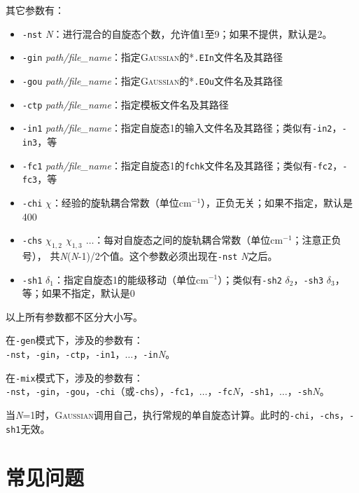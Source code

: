 \documentclass[UTF8]{ctexart}
\begin{document}
\bigskip
其它参数有：
\begin{itemize}[leftmargin= 0 pt]
\item \verb|-nst| \textit{N}：进行混合的自旋态个数，允许值1至9；如果不提供，默认是2。
\item \verb|-gin| \textit{path/file\_name}：指定\textsc{Gaussian}的*\verb|.EIn|文件名及其路径
\item \verb|-gou| \textit{path/file\_name}：指定\textsc{Gaussian}的*\verb|.EOu|文件名及其路径
\item \verb|-ctp| \textit{path/file\_name}：指定模板文件名及其路径
\item \verb|-in1| \textit{path/file\_name}：指定自旋态1的输入文件名及其路径；类似有\verb|-in2|，\verb|-in3|，等
\item \verb|-fc1| \textit{path/file\_name}：指定自旋态1的\verb|fchk|文件名及其路径；类似有\verb|-fc2|，\verb|-fc3|，等
\item \verb|-chi| \textit{$\chi$}：经验的旋轨耦合常数（单位cm$^{-1}$），正负无关；如果不指定，默认是400
\item \verb|-chs| \textit{$\chi_{1,2}$ $\chi_{1,3}$ $\ldots$}：每对自旋态之间的旋轨耦合常数（单位cm$^{-1}$；注意正负号），
  共\textit{N}(\textit{N}-1)/2个值。这个参数必须出现在\verb|-nst| \textit{N}之后。
\item \verb|-sh1| \textit{$\delta_1$}：指定自旋态1的能级移动（单位cm$^{-1}$）；类似有\verb|-sh2| \textit{$\delta_2$}，\verb|-sh3| \textit{$\delta_3$}，等；如果不指定，默认是0
\end{itemize}

\bigskip
以上所有参数都不区分大小写。

\bigskip
在\verb|-gen|模式下，涉及的参数有：\\
\verb|-nst|，\verb|-gin|，\verb|-ctp|，\verb|-in1|，$\ldots$，\verb|-in|\textit{N}。

\bigskip
在\verb|-mix|模式下，涉及的参数有：\\
\verb|-nst|，\verb|-gin|，\verb|-gou|，\verb|-chi|（或\verb|-chs|），\verb|-fc1|，$\ldots$，\verb|-fc|\textit{N}，\verb|-sh1|，$\ldots$，\verb|-sh|\textit{N}。

\bigskip
当\textit{N}=1时，\textsc{Gaussian}调用自己，执行常规的单自旋态计算。此时的\verb|-chi|，\verb|-chs|，\verb|-sh1|无效。

\newpage

\section{常见问题}
\end{document}
